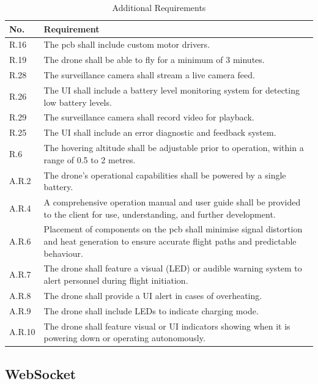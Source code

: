 \begin{table}[H]
\centering
\caption{Additional Requirements}
\begin{tabular}{|>{\centering\arraybackslash}p{} | p{}|}
\hline
\rowcolor{gray!15}
\textbf{No.} & \textbf{Requirement} \\
\hline
R.16 & The \gls{pcb} shall include custom motor drivers. \\
\hline
R.19 & The drone shall be able to fly for a minimum of 3 minutes. \\
\hline
R.28 & The surveillance camera shall stream a live camera feed. \\
\hline
R.26 & The UI shall include a battery level monitoring system for detecting low battery levels. \\
\hline
R.29 & The surveillance camera shall record video for playback. \\
\hline
R.25 & The UI shall include an error diagnostic and feedback system. \\
\hline
R.6  & The hovering altitude shall be adjustable prior to operation, within a range of 0.5 to 2 metres. \\
\hline
A.R.2 & The drone’s operational capabilities shall be powered by a single battery. \\
\hline
A.R.4 & A comprehensive operation manual and user guide shall be provided to the client for use, understanding, and further development. \\
\hline
A.R.6 & Placement of components on the \gls{pcb} shall minimise signal distortion and heat generation to ensure accurate flight paths and predictable behaviour. \\
\hline
A.R.7 & The drone shall feature a visual (LED) or audible warning system to alert personnel during flight initiation. \\
\hline
A.R.8 & The drone shall provide a UI alert in cases of overheating. \\
\hline
A.R.9 & The drone shall include LEDs to indicate charging mode. \\
\hline
A.R.10 & The drone shall feature visual or UI indicators showing when it is powering down or operating autonomously. \\
\hline
\end{tabular}
\end{table}

\subsection{WebSocket}
\label{app:websocket}

